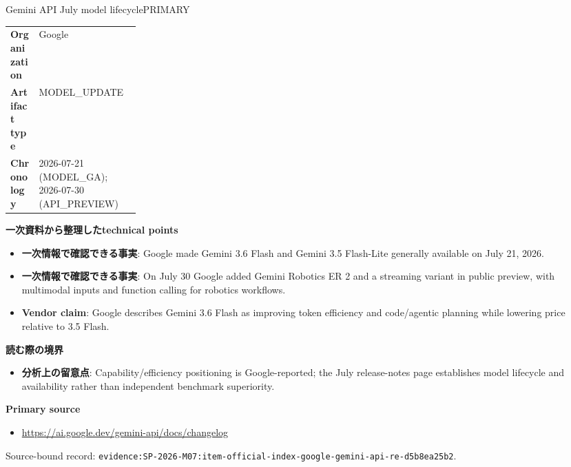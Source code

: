 \begin{technicalnote}{Gemini API July model lifecycle}{PRIMARY}
\begin{tabularx}{\linewidth}{@{}>{\bfseries}p{0.22\linewidth}X@{}}
Organization & Google \\
Artifact type & MODEL\_UPDATE \\
Chronology & 2026-07-21 (MODEL\_GA); 2026-07-30 (API\_PREVIEW) \\
\end{tabularx}
\smallskip
{\bfseries 一次資料から整理したtechnical points}
\begin{itemize}[leftmargin=1.5em,itemsep=0.35em]
\item \textbf{一次情報で確認できる事実}: Google made Gemini 3.6 Flash and Gemini 3.5 Flash-Lite generally available on July 21, 2026.
\item \textbf{一次情報で確認できる事実}: On July 30 Google added Gemini Robotics ER 2 and a streaming variant in public preview, with multimodal inputs and function calling for robotics workflows.
\item \textbf{Vendor claim}: Google describes Gemini 3.6 Flash as improving token efficiency and code/agentic planning while lowering price relative to 3.5 Flash.
\end{itemize}
{\bfseries 読む際の境界}
\begin{itemize}[leftmargin=1.5em,itemsep=0.35em]
\item \textbf{分析上の留意点}: Capability/efficiency positioning is Google-reported; the July release-notes page establishes model lifecycle and availability rather than independent benchmark superiority.
\end{itemize}
{\bfseries Primary source}
\begin{itemize}[leftmargin=1.5em,itemsep=0.25em]
\item \url{https://ai.google.dev/gemini-api/docs/changelog}
\end{itemize}
{\scriptsize\color{SurveyMuted}Source-bound record: \texttt{evidence:SP-2026-M07:item-official-index-google-gemini-api-re-d5b8ea25b2}.}
\end{technicalnote}
\medskip

